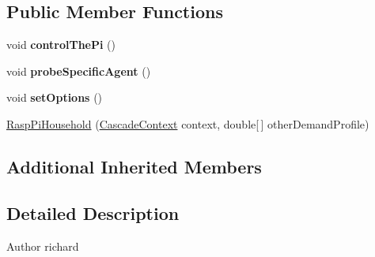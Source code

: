 \subsection*{Public Member Functions}
\begin{DoxyCompactItemize}
\item 
\hypertarget{classuk_1_1ac_1_1dmu_1_1iesd_1_1cascade_1_1agents_1_1prosumers_1_1_rasp_pi_household_a1be11d714bb87d37ec4a9146e3c85e7d}{void {\bfseries control\-The\-Pi} ()}\label{classuk_1_1ac_1_1dmu_1_1iesd_1_1cascade_1_1agents_1_1prosumers_1_1_rasp_pi_household_a1be11d714bb87d37ec4a9146e3c85e7d}

\item 
\hypertarget{classuk_1_1ac_1_1dmu_1_1iesd_1_1cascade_1_1agents_1_1prosumers_1_1_rasp_pi_household_a01d0536b9f8b7c30eb7af9e73bea787a}{void {\bfseries probe\-Specific\-Agent} ()}\label{classuk_1_1ac_1_1dmu_1_1iesd_1_1cascade_1_1agents_1_1prosumers_1_1_rasp_pi_household_a01d0536b9f8b7c30eb7af9e73bea787a}

\item 
\hypertarget{classuk_1_1ac_1_1dmu_1_1iesd_1_1cascade_1_1agents_1_1prosumers_1_1_rasp_pi_household_a71f7c1f90742a8b818ce3fe7b83250b0}{void {\bfseries set\-Options} ()}\label{classuk_1_1ac_1_1dmu_1_1iesd_1_1cascade_1_1agents_1_1prosumers_1_1_rasp_pi_household_a71f7c1f90742a8b818ce3fe7b83250b0}

\item 
\hyperlink{classuk_1_1ac_1_1dmu_1_1iesd_1_1cascade_1_1agents_1_1prosumers_1_1_rasp_pi_household_ac9add7c08c7017122cc0836b5d2ecd70}{Rasp\-Pi\-Household} (\hyperlink{classuk_1_1ac_1_1dmu_1_1iesd_1_1cascade_1_1context_1_1_cascade_context}{Cascade\-Context} context, double\mbox{[}$\,$\mbox{]} other\-Demand\-Profile)
\end{DoxyCompactItemize}
\subsection*{Additional Inherited Members}


\subsection{Detailed Description}
\begin{DoxyAuthor}{Author}
richard 
\end{DoxyAuthor}



